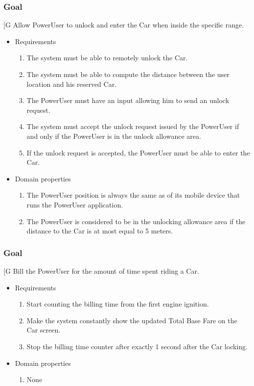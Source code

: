     \subsubsection{Goal }
    {[}G\arabic{goalctr}{]}
	Allow PowerUser to unlock and enter the Car when inside the specific range.
    \begin{itemize}
        \item Requirements
        \begin{enumerate}[REQ]
    	        \item The system must be able to remotely unlock the Car.
			    \item The system must be able to compute the distance between the user location and his reserved Car.
			    \item The PowerUser must have an input allowing him to send an unlock request.
			    \item The system must accept the unlock request issued by the PowerUser if and only if the PowerUser is in the unlock allowance area.
			    \item If the unlock request is accepted, the PowerUser must be able to enter the Car.
        \end{enumerate}
        \item Domain properties
        \begin{enumerate}[PRO]
                \item The PowerUser position is always the same as of its mobile device that runs the PowerUser application.
    			\item The PowerUser is considered to be in the unlocking allowance area if the distance to the Car is at most equal to 5 meters.
        \end{enumerate}
    \end{itemize}
    
    \subsubsection{Goal }
    {[}G\arabic{goalctr}{]}
	Bill the PowerUser for the amount of time spent riding a Car.
    \begin{itemize}
        \item Requirements
        \begin{enumerate}[REQ]
                \item Start counting the billing time from the first engine ignition.
    	        \item Make the system constantly show the updated Total Base Fare on the Car screen.
    	        \item Stop the billing time counter after exactly 1 second after the Car locking.
        \end{enumerate}
        \item Domain properties
        \begin{enumerate}[PRO]
                \item None
        \end{enumerate}
    \end{itemize}
    

